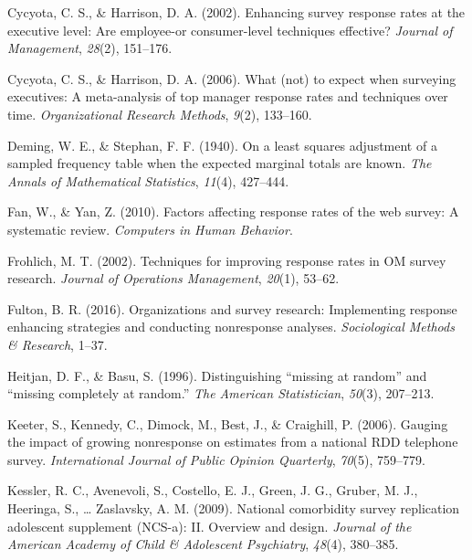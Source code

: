 \documentclass[
  ,man,floatsintext]{apa6}
\newlength{\cslhangindent}
\newlength{\cslentryspacingunit} %
\newenvironment{CSLReferences}[2] %
 {%
  \setlength{\parindent}{0pt}
  \ifodd #1
  \let\oldpar\par
  \def\par{\hangindent=\cslhangindent\oldpar}
  \fi
  \setlength{\parskip}{#2\cslentryspacingunit}
 }%
 {}
\begin{document}
\begin{CSLReferences}{1}{0}
\leavevmode{}%
Cycyota, C. S., \& Harrison, D. A. (2002). Enhancing survey response rates at the executive level: Are employee-or consumer-level techniques effective? \emph{Journal of Management}, \emph{28}(2), 151--176.

\leavevmode{}%
Cycyota, C. S., \& Harrison, D. A. (2006). What (not) to expect when surveying executives: A meta-analysis of top manager response rates and techniques over time. \emph{Organizational Research Methods}, \emph{9}(2), 133--160.

\leavevmode{}%
Deming, W. E., \& Stephan, F. F. (1940). On a least squares adjustment of a sampled frequency table when the expected marginal totals are known. \emph{The Annals of Mathematical Statistics}, \emph{11}(4), 427--444.

\leavevmode{}%
Fan, W., \& Yan, Z. (2010). Factors affecting response rates of the web survey: A systematic review. \emph{Computers in Human Behavior}.

\leavevmode{}%
Frohlich, M. T. (2002). Techniques for improving response rates in {OM} survey research. \emph{Journal of Operations Management}, \emph{20}(1), 53--62.

\leavevmode{}%
Fulton, B. R. (2016). Organizations and survey research: Implementing response enhancing strategies and conducting nonresponse analyses. \emph{Sociological Methods \& Research}, 1--37.

\leavevmode{}%
Heitjan, D. F., \& Basu, S. (1996). Distinguishing {``missing at random''} and {``missing completely at random.''} \emph{The American Statistician}, \emph{50}(3), 207--213.

\leavevmode{}%
Keeter, S., Kennedy, C., Dimock, M., Best, J., \& Craighill, P. (2006). Gauging the impact of growing nonresponse on estimates from a national {RDD} telephone survey. \emph{International Journal of Public Opinion Quarterly}, \emph{70}(5), 759--779.

\leavevmode{}%
Kessler, R. C., Avenevoli, S., Costello, E. J., Green, J. G., Gruber, M. J., Heeringa, S., \ldots{} Zaslavsky, A. M. (2009). National comorbidity survey replication adolescent supplement ({NCS}-a): {II}. Overview and design. \emph{Journal of the American Academy of Child \& Adolescent Psychiatry}, \emph{48}(4), 380--385.


\end{CSLReferences}
\end{document}
